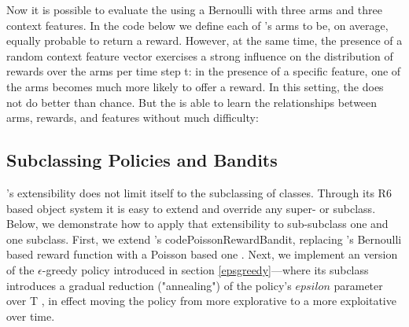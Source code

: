 \documentclass{jss}
\begin{document}
Now it is possible to evaluate the  using a Bernoulli  with three arms and three context features. In the code below we define each of 's arms to be, on average, equally probable to return a reward. However, at the same time, the presence of a random context feature vector exercises a strong influence on the distribution of rewards over the arms per time step t: in the presence of a specific feature, one of the arms becomes much more likely to offer a reward. In this setting, the  does not do better than chance. But the  is able to learn the relationships between arms, rewards, and features without much difficulty:


\subsection{Subclassing Policies and Bandits} \label{subclpb}

's extensibility does not limit itself to the subclassing of  classes. Through its R6 based object system it is easy to extend and override any  super- or subclass. Below, we demonstrate how to apply that extensibility to sub-subclass one  and one  subclass.
First, we extend 's code{PoissonRewardBandit}, replacing 's Bernoulli based reward function with a Poisson based one \citep{Presman1991}. Next, we implement an  version of the $\epsilon$-greedy policy introduced in section \ref{epsgreedy}---where its  subclass introduces a gradual reduction ("annealing") of the policy's $epsilon$ parameter over T \citep{Cesa-Bianchi1998,Kirkpatrick1983}, in effect moving the policy from more explorative to a more exploitative over time.
\end{document}

